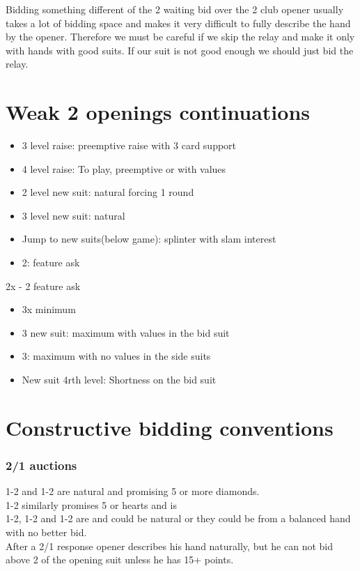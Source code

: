 \documentclass[11pt]{article}
\begin{document}
Bidding something different of the 2 waiting bid over the 2 club opener usually takes a lot of bidding space and makes it very difficult to fully describe the hand by the opener. Therefore we must be careful if we skip the relay and make it only with hands with good suits. If our suit is not good enough we should just bid the relay. 
\section*{Weak 2 openings continuations}
\label{sec:org0b2f611}
\begin{itemize}
\item 3 level raise: preemptive raise with 3 card support
\item 4 level raise: To play, preemptive or with values
\item 2 level new suit: natural forcing 1 round
\item 3 level new suit: natural
\item Jump to new suits(below game): splinter with slam interest
\item 2: feature ask
\end{itemize}

2x - 2 feature ask
\begin{itemize}
\item 3x               minimum
\item 3 new suit:  maximum with values in the bid suit
\item 3:            maximum with no values in the side suits
\item New suit 4rth level: Shortness on the bid suit
\end{itemize}
\section*{Constructive bidding conventions}
\label{sec:org8be17a5}
\subsubsection*{2/1 auctions}
\label{sec:org97edb32}
1-2 and 1-2 are natural and promising 5 or more diamonds.\\
1-2 similarly promises 5 or hearts and is \\
1-2, 1-2 and 1-2 are and could be natural or they could be from a balanced hand with no better bid.\\

After a 2/1 response opener describes his hand naturally, but he can not bid above 2 of the opening suit unless he has 15+ points.\\
\end{document}
